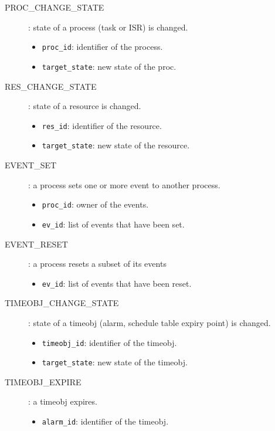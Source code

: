 \begin{description}
  \item[PROC\_CHANGE\_STATE]: state of a process (task or ISR) is changed.
    \begin{itemize}
      \item \texttt{proc\_id}: identifier of the process.
      \item \texttt{target\_state}: new state of the proc. %
    \end{itemize}

  \item[RES\_CHANGE\_STATE]: state of a resource is changed.
    \begin{itemize}
      \item \texttt{res\_id}: identifier of the resource.
      \item \texttt{target\_state}: new state of the resource. %
    \end{itemize}

  \item[EVENT\_SET]: a process sets one or more event to another process.
    \begin{itemize}
      \item \texttt{proc\_id}: owner of the events.
      \item \texttt{ev\_id}: list of events that have been set.
    \end{itemize}

  \item[EVENT\_RESET]: a process resets a subset of its events
    \begin{itemize}
      \item \texttt{ev\_id}: list of events that have been reset.
    \end{itemize}

  \item[TIMEOBJ\_CHANGE\_STATE]: state of a timeobj (alarm, schedule table
    expiry point) is changed.
    \begin{itemize}
      \item \texttt{timeobj\_id}: identifier of the timeobj.
      \item \texttt{target\_state}: new state of the timeobj.
    \end{itemize}

  \item[TIMEOBJ\_EXPIRE]: a timeobj expires.
    \begin{itemize}
      \item \texttt{alarm\_id}: identifier of the timeobj.
    \end{itemize}

\end{description}


